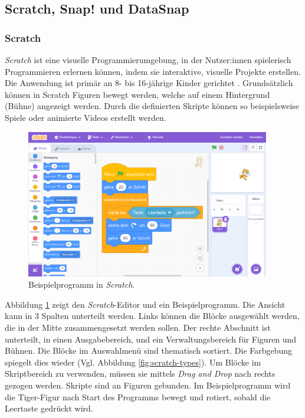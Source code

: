 \newcommand{\Scratch}{\textit{Scratch}}
\newcommand{\Snap}{\textit{Snap!}}

\subsection{Scratch, Snap! und DataSnap}
\subsubsection{Scratch}
\Scratch{} ist eine visuelle Programmierumgebung, in der Nutzer:innen spielerisch Programmieren erlernen können, indem sie interaktive, visuelle Projekte erstellen. Die Anwendung ist primär an 8- bis 16-jährige Kinder gerichtet \parencite{maloneyScratchProgramming2010}. Grundsätzlich können in Scratch Figuren bewegt werden, welche auf einem Hintergrund (Bühne) angezeigt werden. Durch die definierten Skripte können so beispielsweise Spiele oder animierte Videos erstellt werden.

\begin{figure}[!ht]
  \begin{center}
    \includegraphics[width=0.95\textwidth]{assets/scratch.png}
  \end{center}
  \caption{Beispielprogramm in \Scratch{}. }
  \label{fig:scratch}
\end{figure}

Abbildung \ref{fig:scratch} zeigt den \Scratch{}-Editor und ein Beispielprogramm. Die Ansicht kann in 3 Spalten unterteilt werden. Links können die Blöcke ausgewählt werden, die in der Mitte zusammengesetzt werden sollen. Der rechte Abschnitt ist unterteilt, in einen Ausgabebereich, und ein Verwaltungsbereich für Figuren und Bühnen. Die Blöcke im Auswahlmenü sind thematisch sortiert. Die Farbgebung spiegelt dies wieder (Vgl. Abbildung \ref{fig:scratch-types}). Um Blöcke im Skriptbereich zu verwenden, müssen sie mittels \textit{Drag and Drop} nach rechts gezogen werden. Skripte sind an Figuren gebunden. Im Beispielprogramm wird die Tiger-Figur nach Start des Programms bewegt und rotiert, sobald die Leertaste gedrückt wird.
\parencite{maloneyScratchProgramming2010}


